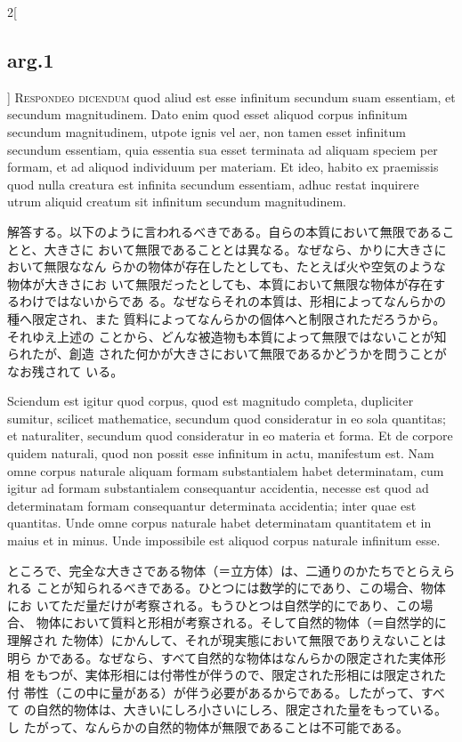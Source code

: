 \documentclass[paper=a4paper,fontsize=10pt,jafontsize=9pt,titlepage]{jlreq}
\begin{document}
\begin{paracol}{2}[\subsection{arg.1}]
{\scshape Respondeo dicendum} quod aliud est esse infinitum secundum suam
 essentiam, et secundum magnitudinem. Dato enim quod esset aliquod
 corpus infinitum secundum magnitudinem, utpote ignis vel aer, non tamen
 esset infinitum secundum essentiam, quia essentia sua esset terminata
 ad aliquam speciem per formam, et ad aliquod individuum per
 materiam. Et ideo, habito ex praemissis quod nulla creatura est
 infinita secundum essentiam, adhuc restat inquirere utrum aliquid
 creatum sit infinitum secundum magnitudinem.

\switchcolumn

解答する。以下のように言われるべきである。自らの本質において無限であることと、大きさに
 おいて無限であることとは異なる。なぜなら、かりに大きさにおいて無限ななん
 らかの物体が存在したとしても、たとえば火や空気のような物体が大きさにお
 いて無限だったとしても、本質において無限な物体が存在するわけではないからであ
 る。なぜならそれの本質は、形相によってなんらかの種へ限定され、また
 質料によってなんらかの個体へと制限されただろうから。それゆえ上述の
 ことから、どんな被造物も本質によって無限ではないことが知られたが、創造
 された何かが大きさにおいて無限であるかどうかを問うことがなお残されて
 いる。

\switchcolumn*

Sciendum est igitur quod corpus, quod est magnitudo completa,
 dupliciter sumitur, scilicet mathematice, secundum quod consideratur in
 eo sola quantitas; et naturaliter, secundum quod consideratur in eo
 materia et forma. Et de corpore quidem naturali, quod non possit esse
 infinitum in actu, manifestum est. Nam omne corpus naturale aliquam
 formam substantialem habet determinatam, cum igitur ad formam
 substantialem consequantur accidentia, necesse est quod ad determinatam
 formam consequantur determinata accidentia; inter quae est
 quantitas. Unde omne corpus naturale habet determinatam quantitatem et
 in maius et in minus. Unde impossibile est aliquod corpus naturale
 infinitum esse.

\switchcolumn

ところで、完全な大きさである物体（＝立方体）は、二通りのかたちでとらえられる
 ことが知られるべきである。ひとつには数学的にであり、この場合、物体にお
 いてただ量だけが考察される。もうひとつは自然学的にであり、この場合、
 物体において質料と形相が考察される。そして自然的物体（＝自然学的に理解され
 た物体）にかんして、それが現実態において無限でありえないことは明ら
 かである。なぜなら、すべて自然的な物体はなんらかの限定された実体形相
 をもつが、実体形相には付帯性が伴うので、限定された形相には限定された付
 帯性（この中に量がある）が伴う必要があるからである。したがって、すべて
 の自然的物体は、大きいにしろ小さいにしろ、限定された量をもっている。し
 たがって、なんらかの自然的物体が無限であることは不可能である。


\end{paracol}
\end{document}
